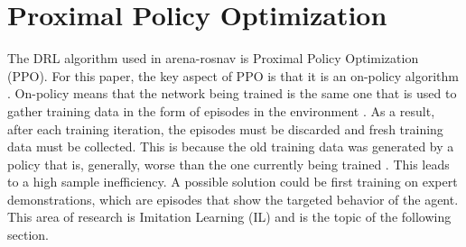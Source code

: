 \section{Proximal Policy Optimization}
The DRL algorithm used in arena-rosnav is Proximal Policy Optimization (PPO). For this paper, the key aspect of PPO is that it is an on-policy algorithm \citep{ppo}. On-policy means that the network being trained is the same one that is used to gather training data in the form of episodes in the environment \citep{lapan}. As a result, after each training iteration, the episodes must be discarded and fresh training data must be collected. This is because the old training data was generated by a policy that is, generally, worse than the one currently being trained \citep{lapan}.
This leads to a high sample inefficiency. A possible solution could be first training on expert demonstrations, which are episodes that show the targeted behavior of the agent. This area of research is Imitation Learning (IL) and is the topic of the following section.
